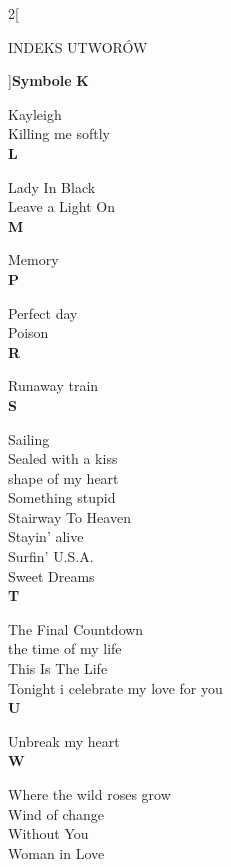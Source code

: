 \documentclass[a4paper]{report}
\begin{document}
\begin{multicols*}{2}[\begin{Huge}INDEKS UTWORÓW\end{Huge}\vspace{1cm}]{\Large\bfseries  Symbole  }
\indexspace
{\Large\bfseries  K  }\nopagebreak 

Kayleigh  \\
Killing me softly  \\

\indexspace
{\Large\bfseries  L  }\nopagebreak 

Lady In Black  \\
Leave a Light On  \\

\indexspace
{\Large\bfseries  M  }\nopagebreak 

Memory  \\

\indexspace
{\Large\bfseries  P  }\nopagebreak 

Perfect day  \\
Poison  \\

\indexspace
{\Large\bfseries  R  }\nopagebreak 

Runaway train  \\

\indexspace
{\Large\bfseries  S  }\nopagebreak 

Sailing  \\
Sealed with a kiss  \\
shape of my heart  \\
Something stupid  \\
Stairway To Heaven  \\
Stayin' alive  \\
Surfin' U.S.A.  \\
Sweet Dreams  \\

\indexspace
{\Large\bfseries  T  }\nopagebreak 

The Final Countdown  \\
the time of my life  \\
This Is The Life  \\
Tonight i celebrate my love for you  \\

\indexspace
{\Large\bfseries  U  }\nopagebreak 

Unbreak my heart  \\

\indexspace
{\Large\bfseries  W  }\nopagebreak 

Where the wild roses grow  \\
Wind of change  \\
Without You  \\
Woman in Love  \\



\end{multicols*}
\end{document}
